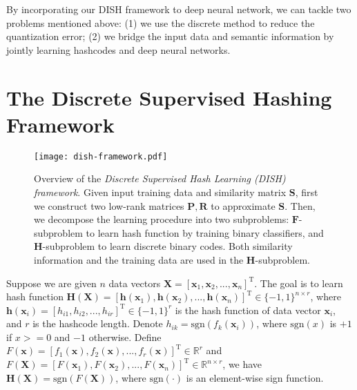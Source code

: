 \documentclass[conference]{IEEEtran}
\begin{document}
By incorporating our DISH framework to deep neural network, we can tackle two problems mentioned above: (1) we use the discrete method to reduce the quantization error; (2) we bridge the input data and semantic information by jointly learning hashcodes and deep neural networks.

\section{The Discrete Supervised Hashing Framework}
\label{sec:framework}

\begin{figure*}[t]
    \centering
    \texttt{[image: dish-framework.pdf]}
    \caption{Overview of the {\em Discrete Supervised Hash Learning (DISH) framework}. Given input training data and similarity matrix $\mathbf{S}$, first we construct two low-rank matrices $\mathbf{P},\mathbf{R}$ to approximate $\mathbf{S}$. Then, we decompose the learning procedure into two subproblems: $\mathbf{F}$-subproblem to learn hash function by training binary classifiers, and $\mathbf{H}$-subproblem to learn discrete binary codes. Both similarity information and the training data are used in the $\mathbf{H}$-subproblem.}
    \label{fig:framework}
\end{figure*}

Suppose we are given $n$ data vectors $\mathbf{X}=[\mathbf{x}_1,\mathbf{x}_2,...,\mathbf{x}_n]^\mathrm{T}$. The goal is to learn hash function $\mathbf{H}(\mathbf{X})=[\mathbf{h}(\mathbf{x}_1),\mathbf{h}(\mathbf{x}_2),...,\mathbf{h}(\mathbf{x}_n)]^\mathrm{T} \in \{-1,1\}^{n \times r}$, where $\mathbf{h}(\mathbf{x}_i) = [h_{i1},h_{i2},...,h_{ir}]^\mathrm{T} \in \{-1,1\}^r$ is the hash function of data vector $\mathbf{x}_i$, and $r$ is the hashcode length. Denote $h_{ik}=\mathrm{sgn}(f_k(\mathbf{x}_i))$, where $\mathrm{sgn}(x)$ is $+1$ if $x>=0$ and $-1$ otherwise. Define $F(\mathbf{x})=[f_1(\mathbf{x}), f_2(\mathbf{x}),...,f_r(\mathbf{x})]^\mathrm{T} \in \mathbb{R}^{r}$ and $F(\mathbf{X})=[F(\mathbf{x}_1),F(\mathbf{x}_2),...,F(\mathbf{x}_n)]^\mathrm{T} \in \mathbb{R}^{n \times r}$, we have $\mathbf{H}(\mathbf{X})=\mathrm{sgn} (F(\mathbf{X}))$, where $\mathrm{sgn}(\cdot)$ is an element-wise sign function.
\end{document}
